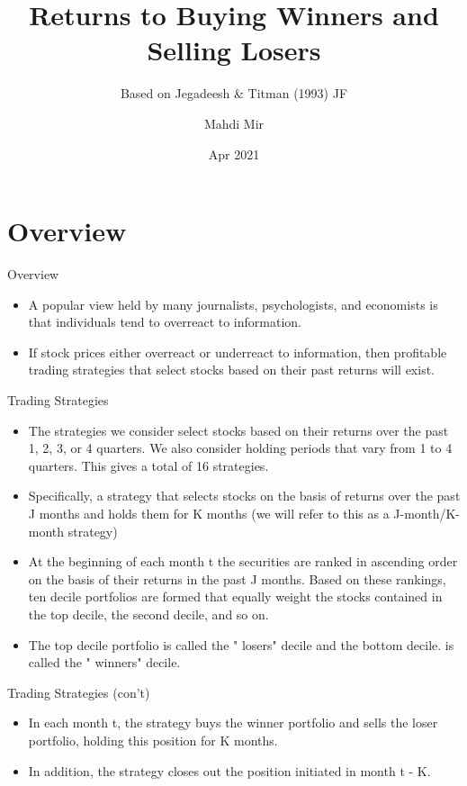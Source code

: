 \documentclass[aspectratio=169]{beamer}
\title[Returns to Buying Winners and Selling Losers]{Returns to Buying Winners and Selling Losers}
\subtitle{Based on Jegadeesh \& Titman (1993) JF }
\author[Mahdi Mir]{Mahdi Mir}
\institute{TeIAS}
\date[Apr 2021]{Apr 2021}
\begin{document}
\maketitle


\section{Overview}


\begin{frame}{Overview}
		\begin{itemize}
			\item A popular view held by many journalists, psychologists, and economists is that individuals tend to overreact to information.
			\item If stock prices either overreact or underreact to information, then profitable trading strategies that select stocks based on their past returns will exist.
		\end{itemize}
	\end{frame}


	\begin{frame}{Trading Strategies}
		\begin{itemize}
			\item The strategies we consider select stocks based on their returns over the past 1, 2, 3, or 4 quarters. We also consider holding periods that vary from 1 to 4 quarters. This gives a total of 16 strategies.
			\item Specifically, a strategy that selects stocks on the basis of returns over the past J months and holds them for K months (we will refer to this as a J-month/K-month strategy)
			\item At the beginning of each month t the securities are ranked in ascending order on the basis of their returns in the past J months. Based on these rankings, ten decile portfolios are formed that equally weight the stocks contained in the top decile, the second decile, and so on.
			\item The top decile portfolio is called the " losers" decile and the bottom decile. is called the " winners" decile.
		\end{itemize}
	\end{frame}

	\begin{frame}{Trading Strategies (con't)}
		\begin{itemize}
			\item In each month t, the strategy buys the winner portfolio and sells the loser portfolio, holding this position for K months.
			\item In addition, the strategy closes out the position initiated in month t - K.
		\end{itemize}
	\end{frame}
\end{document}
